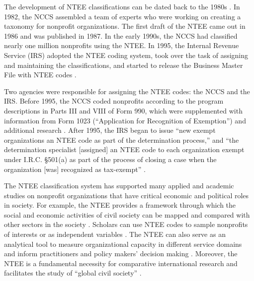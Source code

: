 \documentclass[11pt]{article}
\begin{document}
The development of NTEE classifications can be dated back to the 1980s \parencite[8-9, 11]{HodgkinsonMappingnonprofitsector1990}. In 1982, the NCCS assembled a team of experts who were working on creating a taxonomy for nonprofit organizations. The first draft of the NTEE came out in 1986 and was published in 1987. In the early 1990s, the NCCS had classified nearly one million nonprofits using the NTEE. In 1995, the Internal Revenue Service (IRS) adopted the NTEE coding system, took over the task of assigning and maintaining the classifications, and started to release the Business Master File with NTEE codes \parencite{USInternalRevenueServiceExemptOrganizationsBusiness2014,USInternalRevenueServiceIRSStaticFiles2013}.

Two agencies were responsible for assigning the NTEE codes: the NCCS and the IRS. Before 1995, the NCCS coded nonprofits according to the program descriptions in Parts III and VIII of Form 990, which were supplemented with information from Form 1023 (``Application for Recognition of Exemption'') and additional research \parencite[16]{NationalCenterforCharitableStatisticsGuideUsingNCCS2006}. After 1995, the IRS began to issue ``new exempt organizations an NTEE code as part of the determination process,'' and ``the determination specialist [assigned] an NTEE code to each organization exempt under I.R.C. \S 501(a) as part of the process of closing a case when the organization [was] recognized as tax-exempt'' \parencite[1]{USInternalRevenueServiceIRSStaticFiles2013}.

The NTEE classification system has supported many applied and academic studies on nonprofit organizations that have critical economic and political roles in society. For example, the NTEE provides a framework through which the social and economic activities of civil society can be mapped and compared with other sectors in the society \parencite[e.g.,][]{RoegerNonprofitSectorIts2015}. Scholars can use NTEE codes to sample nonprofits of interests \parencite[e.g.,][]{OktenDeterminantsdonationsprivate2000,SharkeyCommunityCrimeDecline2017,McVeighStructuralInfluencesActivism2006,VasiNoFrackingWay2015} or as independent variables \parencite{SloanEffectsNonprofitAccountability2009}. The NTEE can also serve as an analytical tool to measure organizational capacity in different service domains and inform practitioners and policy makers' decision making \parencite{Hodgkinsonnewresearchplanning1991}. Moreover, the NTEE is a fundamental necessity for comparative international research and facilitates the study of ``global civil society'' \parencite{VakilConfrontingclassificationproblem1997,Salamonsearchnonprofitsector1992,Salamoninternationalclassificationnonprofit1996,HodgkinsonMappingnonprofitsector1990}.
\end{document}
